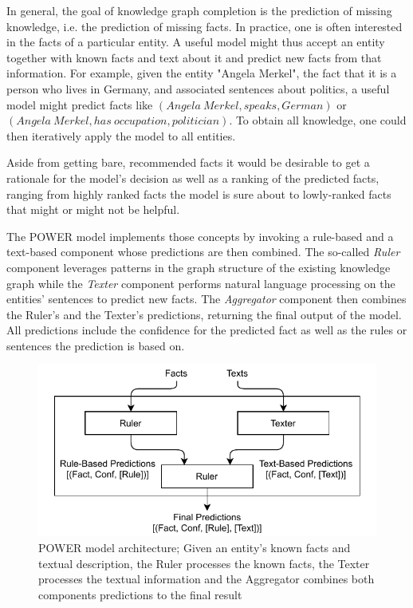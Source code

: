 In general, the goal of knowledge graph completion is the prediction of missing knowledge, i.e. the prediction of missing facts. In practice, one is often interested in the facts of a particular entity. A useful model might thus accept an entity together with known facts and text about it and predict new facts from that information. For example, given the entity "Angela Merkel", the fact that it is a person who lives in Germany, and associated sentences about politics, a useful model might predict facts like $(Angela~Merkel, speaks, German)$ or $(Angela~Merkel, has~occupation, politician)$. To obtain all knowledge, one could then iteratively apply the model to all entities.

Aside from getting bare, recommended facts it would be desirable to get a rationale for the model's decision as well as a ranking of the predicted facts, ranging from highly ranked facts the model is sure about to lowly-ranked facts that might or might not be helpful.

The POWER model implements those concepts by invoking a rule-based and a text-based component whose predictions are then combined. The so-called \emph{Ruler} component leverages patterns in the graph structure of the existing knowledge graph while the \emph{Texter} component performs natural language processing on the entities' sentences to predict new facts. The \emph{Aggregator} component then combines the Ruler's and the Texter's predictions, returning the final output of the model. All predictions include the confidence for the predicted fact as well as the rules or sentences the prediction is based on.

\begin{figure}[t]
    \centering
    \includegraphics[width=\textwidth]{4_approach/power_architecture}
    \caption{POWER model architecture; Given an entity's known facts and textual description, the Ruler processes the known facts, the Texter processes the textual information and the Aggregator combines both components predictions to the final result}
    \label{fig:4_approach/power_architecture}
\end{figure}

